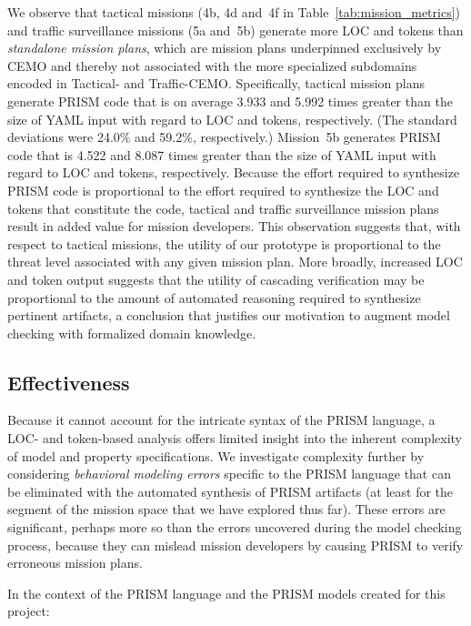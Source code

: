 We observe that tactical missions (4b, 4d and~4f in Table~\ref{tab:mission_metrics}) and traffic surveillance missions (5a and~5b) generate more LOC and tokens than \emph{standalone mission plans}, which are mission plans underpinned exclusively by CEMO and thereby not associated with the more specialized subdomains encoded in Tactical- and Traffic-CEMO\@. Specifically, tactical mission plans generate PRISM code that is on average 3.933 and 5.992 times greater than the size of YAML input with regard to LOC and tokens, respectively. (The standard deviations were 24.0\% and 59.2\%, respectively.) Mission~5b generates PRISM code that is 4.522 and 8.087 times greater than the size of YAML input with regard to LOC and tokens, respectively. Because the effort required to synthesize PRISM code is proportional to the effort required to synthesize the LOC and tokens that constitute the code, tactical and traffic surveillance mission plans result in added value for mission developers. This observation suggests that, with respect to tactical missions, the utility of our prototype is proportional to the threat level associated with any given mission plan. More broadly, increased LOC and token output suggests that the utility of cascading verification may be proportional to the amount of automated reasoning required to synthesize pertinent artifacts, a conclusion that justifies our motivation to augment model checking with formalized domain knowledge.

\subsection{Effectiveness}

Because it cannot account for the intricate syntax of the PRISM language, a LOC- and token-based analysis offers limited insight into the inherent complexity of model and property specifications. We investigate complexity further by considering \emph{behavioral modeling errors} specific to the PRISM language that can be eliminated with the automated synthesis of PRISM artifacts (at least for the segment of the mission space that we have explored thus far). These errors are significant, perhaps more so than the errors uncovered during the model checking process, because they can mislead mission developers by causing PRISM to verify erroneous mission plans.

In the context of the PRISM language and the PRISM models created for this project:

